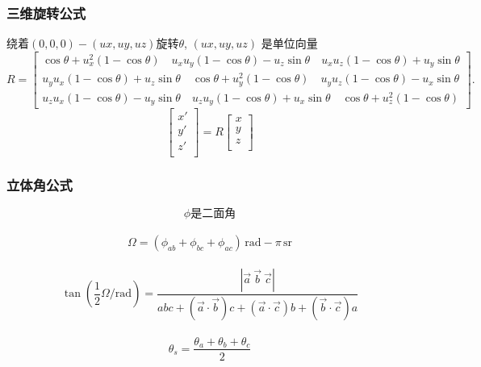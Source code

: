\subsubsection{三维旋转公式}
绕着$(0,0,0)-(ux,uy,uz)$旋转$\theta$, $(ux,uy,uz)$ 是单位向量
\[
R = \begin{bmatrix} \cos \theta +u_x^2 \left(1-\cos \theta\right) \quad u_x u_y \left(1-\cos \theta\right) - u_z \sin \theta \quad u_x u_z \left(1-\cos \theta\right) + u_y \sin \theta \\ u_y u_x \left(1-\cos \theta\right) + u_z \sin \theta \quad \cos \theta + u_y^2\left(1-\cos \theta\right) \quad u_y u_z \left(1-\cos \theta\right) - u_x \sin \theta \\ u_z u_x \left(1-\cos \theta\right) - u_y \sin \theta \quad u_z u_y \left(1-\cos \theta\right) + u_x \sin \theta \quad \cos \theta + u_z^2\left(1-\cos \theta\right) 
\end{bmatrix}.
\]
\[
\begin{bmatrix}
x' \\
y' \\
z' \\
\end{bmatrix} = R
\begin{bmatrix}
x \\
y \\
z \\
\end{bmatrix}
\]
\subsubsection{立体角公式}
\[ \phi 是二面角 \]\\
\[ \Omega = \left(\phi_{ab} + \phi_{bc} + \phi_{ac}\right)\,\mathrm{rad} - \pi\,\mathrm{sr} \]\\
\[\tan \left( \frac{1}{2} \Omega/\mathrm{rad} \right) =
  \frac{\left|\vec a\ \vec b\ \vec c\right|}{abc + \left(\vec a \cdot \vec b\right)c + \left(\vec a \cdot \vec c\right)b + \left(\vec b \cdot \vec c\right)a}\]\\
\[\theta_s = \frac {\theta_a + \theta_b + \theta_c}{2}\]\\
